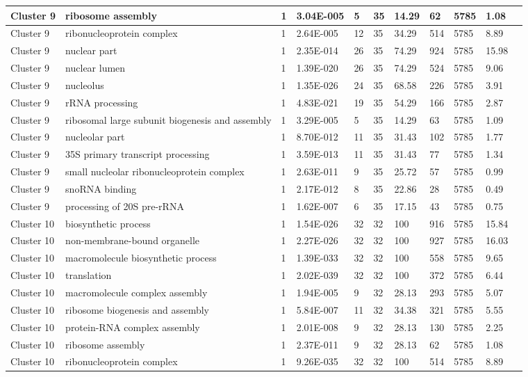 \begin{tabular}{|l|l|l|l|l|l|l|l|l|l|l|}
\hline
Cluster 9&ribosome assembly&1&3.04E-005&5&35&14.29&62&5785&1.08&\\
\hline
Cluster 9&ribonucleoprotein complex&1&2.64E-005&12&35&34.29&514&5785&8.89&\\
\hline
Cluster 9&nuclear part&1&2.35E-014&26&35&74.29&924&5785&15.98&\\
\hline
Cluster 9&nuclear lumen&1&1.39E-020&26&35&74.29&524&5785&9.06&\\
\hline
Cluster 9&nucleolus&1&1.35E-026&24&35&68.58&226&5785&3.91&\\
\hline
Cluster 9&rRNA processing&1&4.83E-021&19&35&54.29&166&5785&2.87&\\
\hline
Cluster 9&ribosomal large subunit biogenesis and assembly&1&3.29E-005&5&35&14.29&63&5785&1.09&\\
\hline
Cluster 9&nucleolar part&1&8.70E-012&11&35&31.43&102&5785&1.77&\\
\hline
Cluster 9&35S primary transcript processing&1&3.59E-013&11&35&31.43&77&5785&1.34&\\
\hline
Cluster 9&small nucleolar ribonucleoprotein complex&1&2.63E-011&9&35&25.72&57&5785&0.99&\\
\hline
Cluster 9&snoRNA binding&1&2.17E-012&8&35&22.86&28&5785&0.49&\\
\hline
Cluster 9&processing of 20S pre-rRNA&1&1.62E-007&6&35&17.15&43&5785&0.75&\\
\hline
Cluster 10&biosynthetic process&1&1.54E-026&32&32&100&916&5785&15.84&\\
\hline
Cluster 10&non-membrane-bound organelle&1&2.27E-026&32&32&100&927&5785&16.03&\\
\hline
Cluster 10&macromolecule biosynthetic process&1&1.39E-033&32&32&100&558&5785&9.65&\\
\hline
Cluster 10&translation&1&2.02E-039&32&32&100&372&5785&6.44&\\
\hline
Cluster 10&macromolecule complex assembly&1&1.94E-005&9&32&28.13&293&5785&5.07&\\
\hline
Cluster 10&ribosome biogenesis and assembly&1&5.84E-007&11&32&34.38&321&5785&5.55&\\
\hline
Cluster 10&protein-RNA complex assembly&1&2.01E-008&9&32&28.13&130&5785&2.25&\\
\hline
Cluster 10&ribosome assembly&1&2.37E-011&9&32&28.13&62&5785&1.08&\\
\hline
Cluster 10&ribonucleoprotein complex&1&9.26E-035&32&32&100&514&5785&8.89&\\

\end{tabular}
